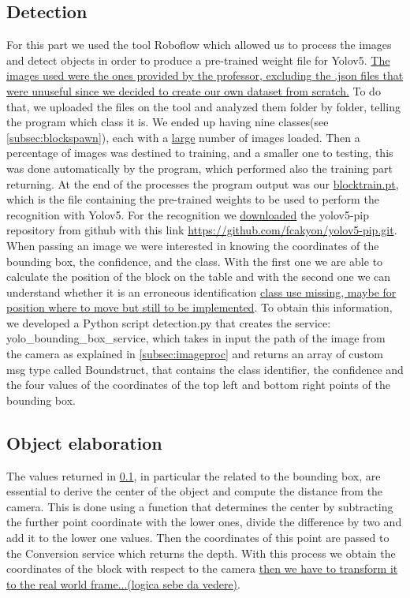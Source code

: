 \documentclass[12pt,a4paper]{article}
\begin{document}
\subsection{Detection}\label{subsec:detect}
For this part we used the tool Roboflow which allowed us to process the images and detect objects in order to produce a pre-trained weight file for Yolov5. \uline{The images used were the ones provided by the professor, excluding the .json files that were unuseful since we decided to create our own dataset from scratch.} To do that, we uploaded the files on the tool and analyzed them folder by folder, telling the program which class it is. We ended up having nine classes(see \ref{subsec:blockspawn}), each with a \uline{large} number of images loaded. Then a percentage of images was destined to training, and a smaller one to testing, this was done automatically by the program, which performed also the training part returning. At the end of the processes the program output was our \uline{blocktrain.pt}, which is the file containing the pre-trained weights to be used to perform the recognition with Yolov5. For the recognition we \uline{downloaded} the yolov5-pip repository from github with this link \url{https://github.com/fcakyon/yolov5-pip.git}.\\
When passing an image we were interested in knowing the coordinates of the bounding box, the confidence, and the class. With the first one we are able to calculate the position of the block on the table and with the second one we can understand whether it is an erroneous identification \uline{class use missing, maybe for position where to move but still to be implemented}. To obtain this information, we developed a Python script detection.py that creates the service: yolo\_bounding\_box\_service, which takes in input the path of the image from the camera as explained in \ref{subsec:imageproc} and returns an array of custom msg type called Boundstruct, that contains the class identifier, the confidence and the four values of the coordinates of the top left and bottom right points of the bounding box.

\subsection{Object elaboration}\label{subsec:objel}
The values returned in \ref{subsec:detect}, in particular the related to the bounding box, are essential to derive the center of the object and compute the distance from the camera. This is done using a function that determines the center by subtracting the further point coordinate with the lower ones, divide the difference by two and add it to the lower one values. Then the coordinates of this point are passed to the Conversion service which returns the depth. With this process we obtain the coordinates of the block with respect to the camera \uline{then we have to transform it to the real world frame...(logica sebe da vedere)}. \\
\end{document}
